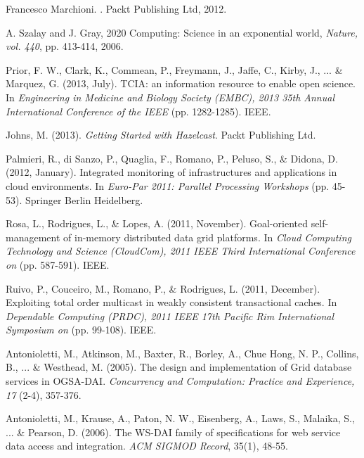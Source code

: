 \documentclass[conference]{IEEEtran}
\begin{document}
\begin{thebibliography}{1}
Francesco Marchioni.
.
\newblock Packt Publishing Ltd, 2012.

 A. Szalay and J. Gray, 2020 Computing: Science in an exponential world, {\em Nature, vol. 440}, pp. 413-414, 2006.

Prior, F. W., Clark, K., Commean, P., Freymann, J., Jaffe, C., Kirby, J., ... \& Marquez, G. (2013, July). TCIA: an information resource to enable open science. In {\em Engineering in Medicine and Biology Society (EMBC), 2013 35th Annual International Conference of the IEEE} (pp. 1282-1285). IEEE.

 Johns, M. (2013). {\em Getting Started with Hazelcast}. Packt Publishing Ltd.

 Palmieri, R., di Sanzo, P., Quaglia, F., Romano, P., Peluso, S., \& Didona, D. (2012, January). Integrated monitoring of infrastructures and applications in cloud environments. In {\em Euro-Par 2011: Parallel Processing Workshops} (pp. 45-53). Springer Berlin Heidelberg.

Rosa, L., Rodrigues, L., \& Lopes, A. (2011, November). Goal-oriented self-management of in-memory distributed data grid platforms. In {\em Cloud Computing Technology and Science (CloudCom), 2011 IEEE Third International Conference on} (pp. 587-591). IEEE.

 Ruivo, P., Couceiro, M., Romano, P., \& Rodrigues, L. (2011, December). Exploiting total order multicast in weakly consistent transactional caches. In {\em Dependable Computing (PRDC), 2011 IEEE 17th Pacific Rim International Symposium on} (pp. 99-108). IEEE.

 Antonioletti, M., Atkinson, M., Baxter, R., Borley, A., Chue Hong, N. P., Collins, B., ... \& Westhead, M. (2005). The design and implementation of Grid database services in OGSA-DAI. {\em  Concurrency and Computation: Practice and Experience, 17} (2-4), 357-376.

 Antonioletti, M., Krause, A., Paton, N. W., Eisenberg, A., Laws, S., Malaika, S., ... \& Pearson, D. (2006). The WS-DAI family of specifications for web service data access and integration. {\em ACM SIGMOD Record}, 35(1), 48-55.
\end{thebibliography}
\end{document}
